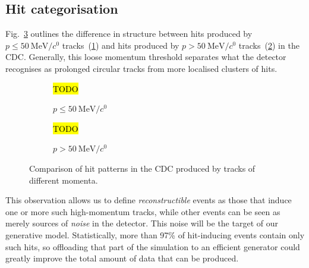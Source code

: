 \subsection{Hit categorisation}
Fig.~\ref{fig:cdc_rconst_vs_noise} outlines the difference in structure between hits produced by $p\leq\SI{50}{\MeV/\clight}$ tracks~(\ref{fig:cdc_rconst_vs_noise:low}) and hits produced by $p>\SI{50}{\MeV/\clight}$ tracks~(\ref{fig:cdc_rconst_vs_noise:high}) in the CDC. Generally, this loose momentum threshold separates what the detector recognises as prolonged circular tracks from more localised clusters of hits.

\begin{figure}
    \centering
    \begin{subfigure}{0.4\textwidth}
        \centering
        \hl{TODO}
        \caption{$p\leq\SI{50}{\MeV/\clight}$}
        \label{fig:cdc_rconst_vs_noise:low}
    \end{subfigure}
    \hfill
    \begin{subfigure}{0.4\textwidth}
        \centering
        \hl{TODO}
        \caption{$p > \SI{50}{\MeV/\clight}$}
        \label{fig:cdc_rconst_vs_noise:high}
    \end{subfigure}
    \caption{Comparison of hit patterns in the CDC produced by tracks of different momenta.}
    \label{fig:cdc_rconst_vs_noise}
\end{figure}

This observation allows us to define \emph{reconstructible} events as those that induce one or more such high-momentum tracks, while other events can be seen as merely sources of \emph{noise} in the detector. This noise will be the target of our generative model. Statistically, more than 97\% of hit-inducing events contain only such hits, so offloading that part of the simulation to an efficient generator could greatly improve the total amount of data that can be produced.

